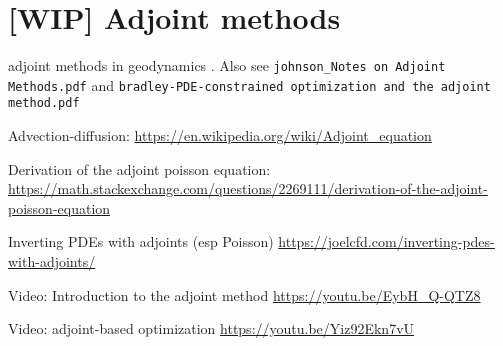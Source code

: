 
\chapter{[WIP] Adjoint methods} %

adjoint methods in geodynamics \cite{bugs09,ghbu16,hobo14,isks07,ligs17,wahg15,wama09,wosp14}.
Also see {\tt johnson\_Notes on Adjoint Methods.pdf} and {\tt bradley-PDE-constrained optimization and the adjoint method.pdf} 

Advection-diffusion: \url{https://en.wikipedia.org/wiki/Adjoint_equation}

Derivation of the adjoint poisson equation: \url{https://math.stackexchange.com/questions/2269111/derivation-of-the-adjoint-poisson-equation}

Inverting PDEs with adjoints (esp Poisson) \url{https://joelcfd.com/inverting-pdes-with-adjoints/}

Video: Introduction to the adjoint method \url{https://youtu.be/EybH_Q-QTZ8}

Video: adjoint-based optimization \url{https://youtu.be/Yiz92Ekn7vU}
